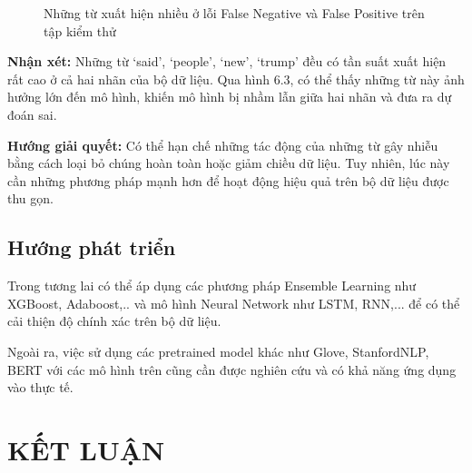 \documentclass[12pt,a4paper,oneside]{book}
\begin{document}
\begin{figure}[H]
	\hfill
	\caption{Những từ xuất hiện nhiều ở lỗi False Negative và False Positive trên tập kiểm thử} 
\end{figure}

\textbf{Nhận xét:} Những từ `said', `people', `new', `trump' đều có tần suất xuất hiện rất cao ở cả hai nhãn của bộ dữ liệu. Qua hình 6.3, có thể thấy những từ này ảnh hưởng lớn đến mô hình, khiến mô hình bị nhầm lẫn giữa hai nhãn và đưa ra dự đoán sai.

\textbf{Hướng giải quyết:} Có thể hạn chế những tác động của những từ gây nhiễu bằng cách loại bỏ chúng hoàn toàn hoặc giảm chiều dữ liệu. Tuy nhiên, lúc này cần những phương pháp mạnh hơn để hoạt động hiệu quả trên bộ dữ liệu được thu gọn.

\section{Hướng phát triển}
Trong tương lai có thể áp dụng các phương pháp Ensemble Learning như XGBoost, Adaboost,.. và mô hình Neural Network như LSTM, RNN,... để có thể cải thiện độ chính xác trên bộ dữ liệu.

Ngoài ra, việc sử dụng các pretrained model khác như Glove, StanfordNLP, BERT với các mô hình trên cũng cần được nghiên cứu và có khả năng ứng dụng vào thực tế.

\chapter*{KẾT LUẬN}
\end{document}
